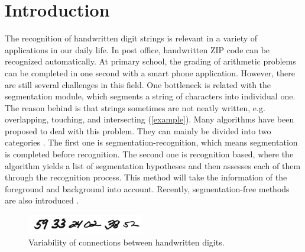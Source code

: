 


% 


\section{Introduction}


The recognition of handwritten digit strings is relevant in a variety of applications in our daily life.
In post office, handwritten ZIP code can be recognized automatically.
At primary school, the grading of arithmetic problems can be completed in one second with a smart phone application.
However, there are still several challenges in this field.
One bottleneck is related with the segmentation module, which segments a string of characters into individual one.
The reason behind is that strings sometimes are not neatly written, e.g. overlapping, touching, and intersecting (\autoref{example}).
Many algorithms have been proposed to deal with this problem.
They can mainly be divided into two categories \citep{casey1996}.
The first one is segmentation-recognition, which means segmentation is completed before recognition.
The second one is recognition based, where the algorithm yields a list of segmentation hypotheses and then assesses each of them through the recognition process.
This method will take the information of the foreground and background into account.
Recently, segmentation-free methods are also introduced \citep{hochuli2018}.

\begin{figure}[ht] %
   \centering
   \includegraphics[width=2in]{example.png} 
   \caption{Variability of connections between handwritten digits.}
   \label{example}
\end{figure}

